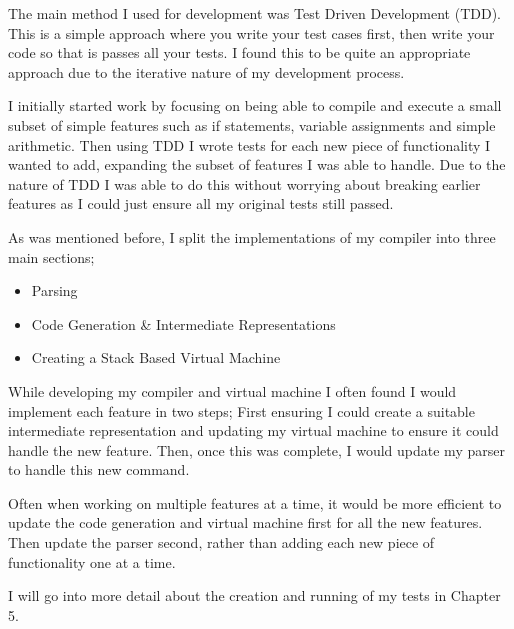 The main method I used for development was Test Driven Development (TDD). This is a simple approach where you write your test cases first, then write your code so that is passes all your tests. I found this to be quite an appropriate approach due to the iterative nature of my development process. 

I initially started work by focusing on being able to compile and execute a small subset of simple features such as if statements, variable assignments and simple arithmetic. Then using TDD I wrote tests for each new piece of functionality I wanted to add, expanding the subset of features I was able to handle. Due to the nature of TDD I was able to do this without worrying about breaking earlier features as I could just ensure all my original tests still passed.

As was mentioned before, I split the implementations of my compiler into three main sections;

\begin{itemize}
	\item Parsing
	\item Code Generation \& Intermediate Representations 
	\item Creating a Stack Based Virtual Machine
\end{itemize}

While developing my compiler and virtual machine I often found I would implement each feature in two steps; First ensuring I could create a suitable intermediate representation and updating my virtual machine to ensure it could handle the new feature. Then, once this was complete, I would update my parser to handle this new command. 

Often when working on multiple features at a time, it would be more efficient to update the code generation and virtual machine first for all the new features. Then update the parser second, rather than adding each new piece of functionality one at a time. 

I will go into more detail about the creation and running of my tests in Chapter 5. 
   